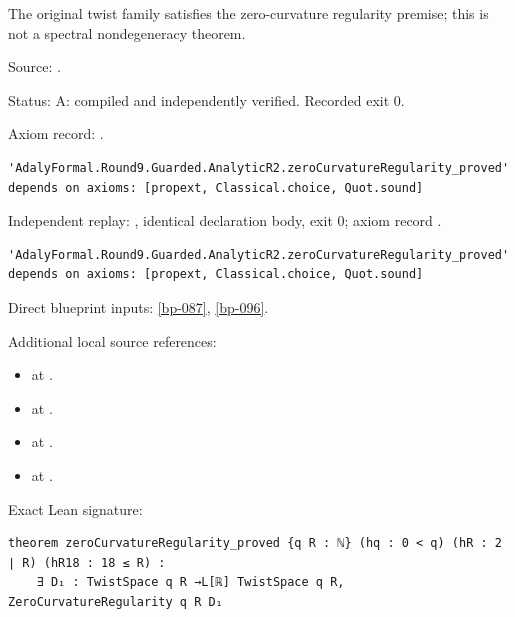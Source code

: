 \begin{theorem}[bp-097]
\label{bp-097}
\leanok
The original twist family satisfies the zero-curvature regularity premise; this is not a spectral nondegeneracy theorem.

\par Source: \texttt{}.
\par Status: A: compiled and independently verified. Recorded exit 0.
\par Axiom record: \texttt{}.
\begin{verbatim}
'AdalyFormal.Round9.Guarded.AnalyticR2.zeroCurvatureRegularity_proved' depends on axioms: [propext, Classical.choice, Quot.sound]
\end{verbatim}
\par Independent replay: \texttt{}, identical declaration body, exit 0; axiom record \texttt{}.
\begin{verbatim}
'AdalyFormal.Round9.Guarded.AnalyticR2.zeroCurvatureRegularity_proved' depends on axioms: [propext, Classical.choice, Quot.sound]
\end{verbatim}
\par Direct blueprint inputs: \ref{bp-087}, \ref{bp-096}.
\par Additional local source references:
\begin{itemize}
\item \texttt{} at \texttt{}.
\item \texttt{} at \texttt{}.
\item \texttt{} at \texttt{}.
\item \texttt{} at \texttt{}.
\end{itemize}
\par Exact Lean signature:
\begin{verbatim}
theorem zeroCurvatureRegularity_proved {q R : ℕ} (hq : 0 < q) (hR : 2 ∣ R) (hR18 : 18 ≤ R) :
    ∃ D₁ : TwistSpace q R →L[ℝ] TwistSpace q R, ZeroCurvatureRegularity q R D₁
\end{verbatim}
\end{theorem}

